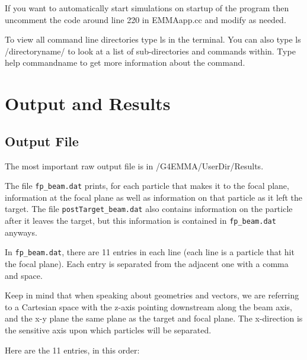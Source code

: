 \documentclass{article}
\newcommand{\filefont}[1]{{\fontfamily{pnc}\selectfont #1}\xspace}
\begin{document}
If you want to automatically start simulations on startup of the program then uncomment the code around line 220 in \filefont{EMMAapp.cc} and modify as needed.

To view all command line directories type \filefont{ls} in the terminal. You can also type \filefont{ls /directoryname/} to look at a list of sub-directories and commands within. Type \filefont{help commandname}  to get more information about the command.

\section{Output and Results}

\subsection{Output File}

The most important raw output file is in \filefont{[path to]/G4EMMA/UserDir/Results}. 

The file \texttt{fp\_beam.dat} prints, for each particle that makes it to the focal plane, information at the focal plane as well as information on that particle as it left the target. The file \texttt{postTarget\_beam.dat} also contains information on the particle after it leaves the target, but this information is contained in \texttt{fp\_beam.dat} anyways. 

In \texttt{fp\_beam.dat}, there are 11 entries in each line (each line is a particle that hit the focal plane). Each entry is separated from the adjacent one with a comma and space. 

Keep in mind that when speaking about geometries and vectors, we are referring to a Cartesian space with the z-axis pointing downstream along the beam axis, and the x-y plane the same plane as the target and focal plane. The x-direction is the sensitive axis upon which particles will be separated. 

Here are the 11 entries, in this order: 
\end{document}
